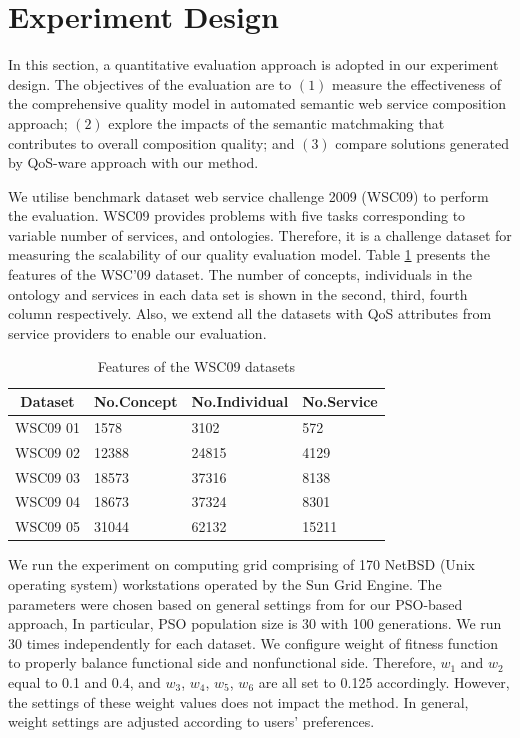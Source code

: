 \documentclass{IEEEtran}
\begin{document}
\section{Experiment Design}\label{experiment_design}
In this section, a quantitative evaluation approach is adopted in our experiment design. The objectives of the evaluation are to $(1)$ measure the effectiveness of the comprehensive quality model in automated semantic web service composition approach; $(2)$ explore the impacts of the semantic matchmaking that contributes to overall composition quality; and $(3)$ compare solutions generated by QoS-ware approach with our method.

We utilise benchmark dataset web service challenge 2009 (WSC09) \cite{kona2009wsc} to perform the evaluation. WSC09 provides problems with five tasks corresponding to variable number of services, and ontologies. Therefore, it is a challenge dataset for measuring the scalability of our quality evaluation model. Table \ref{wsc09datasetTable} presents the features of the WSC’09 dataset. The number of concepts, individuals in the ontology and services in each data set is shown in the second, third, fourth column respectively. Also, we extend all the datasets with QoS attributes from service providers to enable our evaluation. 

\begin{table}[]
\centering
\caption{Features of the WSC09 datasets}
\label{wsc09datasetTable}
\begin{tabular}{l|l|l|l}
\hline
\multicolumn{1}{c|}{Dataset} & No.Concept & No.Individual & No.Service \\ \hline
WSC09 01                     & 1578       &3102           &572      \\ \hline
WSC09 02                     & 12388      &24815          &4129      \\ \hline
WSC09 03                     & 18573      &37316          &8138      \\ \hline
WSC09 04                     & 18673      &37324          &8301      \\ \hline
WSC09 05                     & 31044      &62132          &15211    \\ \hline
\end{tabular}
\end{table}

We run the experiment on computing grid comprising of 170 NetBSD (Unix operating system) workstations operated by the Sun Grid Engine. The parameters were chosen based on general settings from \cite{shi2001particle} for our PSO-based approach, In particular, PSO population size is 30 with 100 generations. We run 30 times independently for each dataset. We configure weight of fitness function to properly balance functional side and nonfunctional side. Therefore, $w_{1}$ and $w_{2}$ equal to 0.1 and 0.4,  and $w_{3}$, $w_{4}$, $w_{5}$, $w_{6}$ are all set to 0.125 accordingly. However, the settings of these weight values does not impact the method. In general, weight settings are adjusted according to users' preferences.
\end{document}
